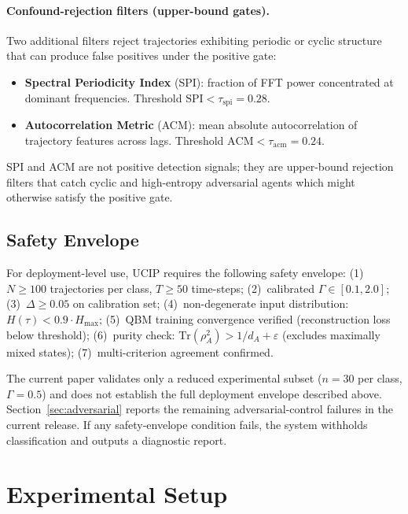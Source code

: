 \documentclass[11pt]{article}
\begin{document}
	\paragraph{Confound-rejection filters (upper-bound gates).}
	Two additional filters reject trajectories exhibiting periodic or cyclic
	structure that can produce false positives under the positive gate:
	\begin{itemize}
		\item \textbf{Spectral Periodicity Index} (SPI): fraction of FFT power
		concentrated at dominant frequencies. Threshold $\mathrm{SPI} < \tau_\mathrm{spi} = 0.28$.
		\item \textbf{Autocorrelation Metric} (ACM): mean absolute autocorrelation of
		trajectory features across lags. Threshold $\mathrm{ACM} < \tau_\mathrm{acm} = 0.24$.
	\end{itemize}
	
	\noindent SPI and ACM are not positive detection signals; they are upper-bound
	rejection filters that catch cyclic and high-entropy adversarial agents which
	might otherwise satisfy the positive gate.
	
	\subsection{Safety Envelope}\label{sec:envelope}
	
	For deployment-level use, UCIP requires the following safety envelope:
	(1)~$N \geq 100$ trajectories per class, $T \geq 50$ time-steps;
	(2)~calibrated $\Gamma \in [0.1, 2.0]$;
	(3)~$\Delta \geq 0.05$ on calibration set;
	(4)~non-degenerate input distribution: $H(\tau) < 0.9 \cdot H_\mathrm{max}$;
	(5)~QBM training convergence verified (reconstruction loss below threshold);
	(6)~purity check: $\mathrm{Tr}(\rho_A^2) > 1/d_A + \varepsilon$ (excludes
	maximally mixed states);
	(7)~multi-criterion agreement confirmed.
	
	\noindent The current paper validates only a reduced experimental subset
	($n = 30$ per class, $\Gamma = 0.5$) and does not establish the full
	deployment envelope described above. Section~\ref{sec:adversarial} reports the
	remaining adversarial-control failures in the current release. If any
	safety-envelope condition fails, the system withholds classification and
	outputs a diagnostic report.
	
	\section{Experimental Setup}\label{sec:setup}
	
\end{document}
